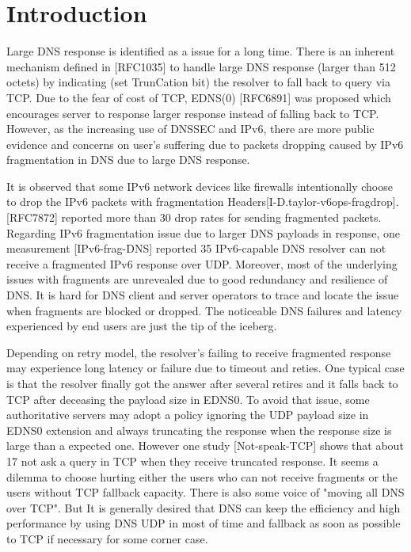 \section{Introduction}

   Large DNS response is identified as a issue for a long time.  There
   is an inherent mechanism defined in [RFC1035] to handle large DNS
   response (larger than 512 octets) by indicating (set TrunCation bit)
   the resolver to fall back to query via TCP.  Due to the fear of cost
   of TCP, EDNS(0) [RFC6891] was proposed which encourages server to
   response larger response instead of falling back to TCP.  However, as
   the increasing use of DNSSEC and IPv6, there are more public evidence
   and concerns on user's suffering due to packets dropping caused by
   IPv6 fragmentation in DNS due to large DNS response.

   It is observed that some IPv6 network devices like firewalls
   intentionally choose to drop the IPv6 packets with fragmentation
   Headers[I-D.taylor-v6ops-fragdrop].  [RFC7872] reported more than 30%
   drop rates for sending fragmented packets.  Regarding IPv6
   fragmentation issue due to larger DNS payloads in response, one
   measurement [IPv6-frag-DNS] reported 35%
   IPv6-capable DNS resolver can not receive a fragmented IPv6 response
   over UDP.  Moreover, most of the underlying issues with fragments are
   unrevealed due to good redundancy and resilience of DNS.  It is hard
   for DNS client and server operators to trace and locate the issue
   when fragments are blocked or dropped.  The noticeable DNS failures
   and latency experienced by end users are just the tip of the iceberg.
   
   Depending on retry model, the resolver's failing to receive
   fragmented response may experience long latency or failure due to
   timeout and reties.  One typical case is that the resolver finally
   got the answer after several retires and it falls back to TCP after
   deceasing the payload size in EDNS0.  To avoid that issue, some
   authoritative servers may adopt a policy ignoring the UDP payload
   size in EDNS0 extension and always truncating the response when the
   response size is large than a expected one.  However one study
   [Not-speak-TCP] shows that about 17%
   not ask a query in TCP when they receive truncated response.  It
   seems a dilemma to choose hurting either the users who can not
   receive fragments or the users without TCP fallback capacity.  There
   is also some voice of "moving all DNS over TCP".  But It is generally
   desired that DNS can keep the efficiency and high performance by
   using DNS UDP in most of time and fallback as soon as possible to TCP
   if necessary for some corner case.

